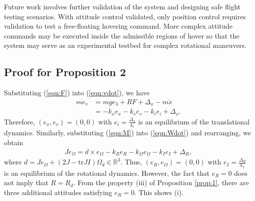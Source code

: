 \documentclass[twocolumn,letterpaper]{IEEEAerospaceCLS}  %
\newcommand{\refeqn}[1]{(\ref{eqn:#1})}
\renewcommand{\Re}{\mathbb{R}}
\begin{document}
Future work involves further validation of the system and designing safe flight testing scenarios. With attitude control validated, only position control requires validation to test a free-floating hovering command. More complex attitude commands may be executed inside the admissible regions of hover so that the system may serve as an experimental testbed for complex rotational maneuvers.

\appendix{}

\subsection{Proof for Proposition 2}		

Substituting \refeqn{F} into \refeqn{vdot}, we have
\begin{align}
m\dot e_v & = mg e_3 + RF +\Delta_x  - m\ddot x \nonumber\\
& =-k_x e_x -k_v e_v -k_i e_i +\Delta_x. \label{eqn:evdot}
\end{align}
Therefore, $(e_x,e_v)=(0,0)$ with $e_i = \frac{\Delta_x}{k_i}$ is an equilibrium of the translational dynamics. Similarly, substituting \refeqn{M} into \refeqn{Wdot} and rearranging, we obtain
\begin{align}
J\dot e_\Omega = d\times e_\Omega - k_R e_R -k_\Omega e_\Omega -k_I e_I + \Delta_R,\label{eqn:JeWdot}
\end{align}
where $d=Je_\Omega + (2J-{\mathrm{tr}}J I) \Omega_d\in{\Re}^3$. Thus, $(e_R,e_\Omega)=(0,0)$ with $e_I=\frac{\Delta_R}{k_I}$ is an equilibrium of the rotational dynamics. However, the fact that $e_R=0$ does not imply that $R=R_d$. From the property (iii) of Proposition \ref{prop:1}, there are three additional attitudes satisfying $e_R=0$. This shows (i).
\end{document}
